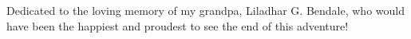 Dedicated to the loving memory of my grandpa, Liladhar G. Bendale, who would have been the happiest and proudest to see the end of this adventure!